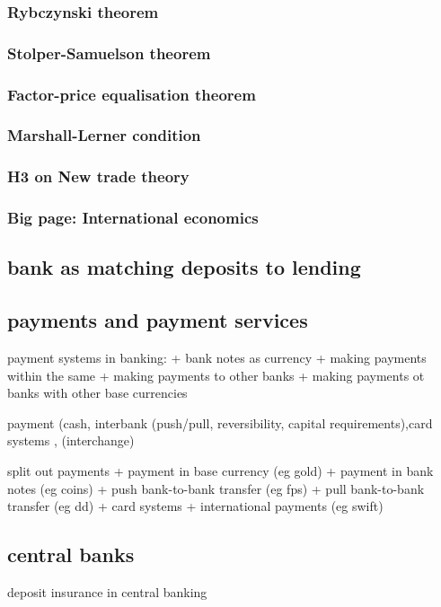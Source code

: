 \subsubsection{Rybczynski theorem}

\subsubsection{Stolper-Samuelson theorem}

\subsubsection{Factor-price equalisation theorem}

\subsubsection{Marshall-Lerner condition}

\subsubsection{H3 on New trade theory}

\subsubsection{Big page: International economics}
\subsection{bank as matching deposits to lending}
\subsection{payments and payment services}

payment systems in banking:
+ bank notes as currency
+ making payments within the same
+ making payments to other banks
+ making payments ot banks with other base currencies

payment (cash, interbank (push/pull, reversibility, capital requirements),card systems ,
(interchange)

split out payments
+ payment in base currency (eg gold)
+ payment in bank notes (eg coins)
+ push bank-to-bank transfer (eg fps)
+ pull bank-to-bank transfer (eg dd)
+ card systems
+ international payments (eg swift)

\subsection{central banks}
deposit insurance in central banking

